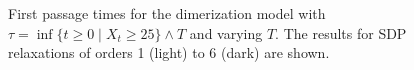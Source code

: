 \begin{figure}
    \myfloatalign
     \quad
    \caption[FPT and MFPT up to a varying time-horizon $T$]{First passage times for the dimerization model with
    $\tau=\inf\{t\geq 0\mid X_t \geq 25\}\land T$ and varying $T$.
    The results for SDP relaxations of orders 1 (light) to 6 (dark) are shown.\label{fig:dim_fpt_fin}}
\end{figure}

